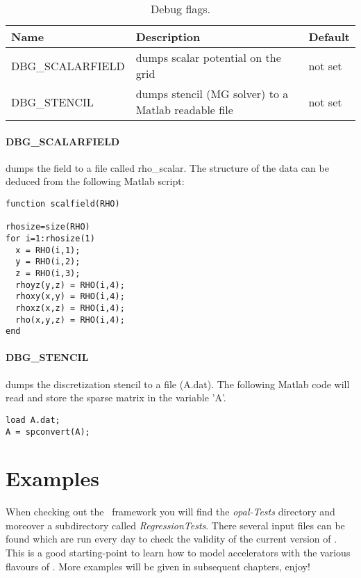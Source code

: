 \begin{table}[ht]\footnotesize
  \begin{center}
    \caption{Debug flags.}
    \label{tbl:debug_flags}
      \begin{tabular}{lll}
        \hline
        {\bf Name} & {\bf Description} & {\bf Default} \\
        \hline
        DBG\_SCALARFIELD & dumps scalar potential on the grid & not set \\
        DBG\_STENCIL & dumps stencil (MG solver) to a Matlab readable file & not set \\
        \hline
      \end{tabular}
    \end{center}
\end{table}

\paragraph{DBG\_SCALARFIELD} dumps the field to a file called rho\_scalar. The structure of the data can be deduced from the following Matlab script:

\begin{footnotesize}
\begin{verbatim}
function scalfield(RHO)

rhosize=size(RHO)
for i=1:rhosize(1)
  x = RHO(i,1);
  y = RHO(i,2);
  z = RHO(i,3);
  rhoyz(y,z) = RHO(i,4);
  rhoxy(x,y) = RHO(i,4);
  rhoxz(x,z) = RHO(i,4);
  rho(x,y,z) = RHO(i,4);
end
\end{verbatim}
\end{footnotesize}

\paragraph{DBG\_STENCIL} dumps the discretization stencil to a file (A.dat). The following Matlab code will read and store the sparse matrix in the variable 'A'.

\begin{footnotesize}
\begin{verbatim}
load A.dat;
A = spconvert(A);
\end{verbatim}
\end{footnotesize}


\section{Examples}
When checking out the \opal\ framework you will find the {\em opal-Tests} directory and moreover
a subdirectory called {\em RegressionTests}. There several input files can be found which are
run every day to check the validity of the current version of \opal. This is a good starting-point to learn how to
model accelerators with the various flavours of \opal. More examples will be given in subsequent chapters, enjoy!



